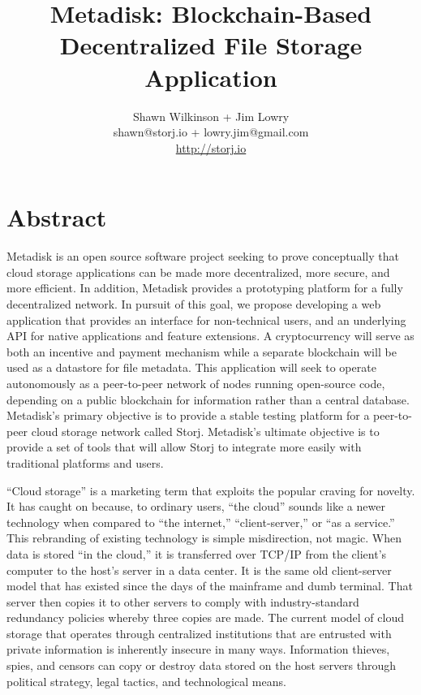 \documentclass[a4paper,12pt]{article}
\begin{document}
\title{\large \bf Metadisk:  Blockchain-Based Decentralized File Storage Application}
\author{\small Shawn Wilkinson + Jim Lowry\\ \small shawn@storj.io + lowry.jim@gmail.com \\  \small \url{http://storj.io}}
\maketitle

\section*{Abstract}
Metadisk is an open source software project seeking to prove conceptually that cloud storage applications can be made more decentralized, more secure, and more efficient. In addition, Metadisk provides a prototyping platform for a fully decentralized network. In pursuit of this goal, we propose developing a web application that provides an interface for non-technical users, and an underlying API for native applications and feature extensions. A cryptocurrency will serve as both an incentive and payment mechanism while a separate blockchain will be used as a datastore for file metadata. This application will seek to operate autonomously as a peer-to-peer network of nodes running open-source code, depending on a public blockchain for information rather than a central database. Metadisk’s primary objective is to provide a stable testing platform for a peer-to-peer cloud storage network called Storj. Metadisk’s ultimate objective is to provide a set of tools that will allow Storj to integrate more easily with traditional platforms and users. 



“Cloud storage” is a marketing term that exploits the popular craving for novelty. It has caught on because, to ordinary users, “the cloud” sounds like a newer technology when compared to “the internet,” “client-server,” or “as a service.” This rebranding of existing technology is simple misdirection, not magic.  When data is stored “in the cloud,” it is transferred over TCP/IP from the client’s computer to the host’s server in a data center.  It is the same old client-server model that has existed since the days of the mainframe and dumb terminal. That server then copies it to other servers to comply with industry-standard redundancy policies whereby three copies are made. The current model of cloud storage that operates through centralized institutions that are entrusted with private information is inherently insecure in many ways.  Information thieves, spies, and censors can copy or destroy data stored on the host servers through political strategy, legal tactics, and technological means. \\
\end{document}
